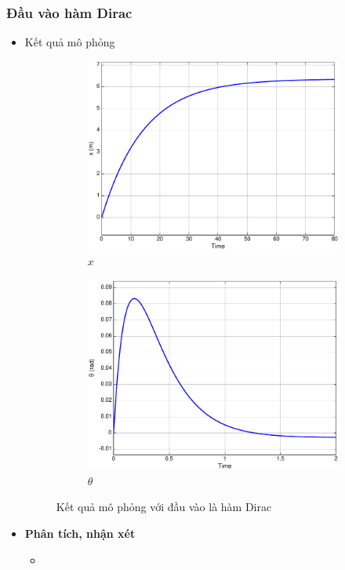 \documentclass[12pt,a4paper]{article}
\begin{document}
\subsubsection{Đầu vào hàm Dirac}
\begin{itemize}
    \item Kết quả mô phỏng 
    \begin{figure}[ht]
        \centering
        \begin{subfigure}[b]{0.495\linewidth}
            \centering
            \includegraphics[width=\linewidth]{phan_tich_x_dirac.pdf}
            \caption{$x$}
        \end{subfigure}\hfill
        \begin{subfigure}[b]{0.495\linewidth}
            \centering
            \includegraphics[width=\linewidth]{phan_tich_theta_dirac.pdf}
            \caption{$\theta$}
        \end{subfigure}
        \caption{Kết quả mô phỏng với đầu vào là hàm Dirac}
    \end{figure}
    \item \textbf{Phân tích, nhận xét}
    \begin{itemize}
        \item 
    \end{itemize}
\end{itemize}
\end{document}
